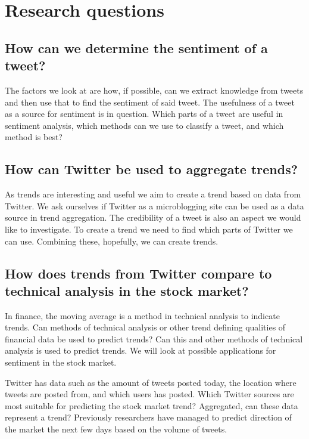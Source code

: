 \section{Research questions}\label{introduction:research_questions}
\subsection{How can we determine the sentiment of a
tweet?}\label{introduction:rq1}

The factors we look at are how, if possible, can we extract knowledge from
tweets and then use that to find the sentiment of said tweet. The usefulness of
a tweet as a source for sentiment is in question. Which parts of a tweet are
useful in sentiment analysis, which methods can we use to classify a tweet, and
which method is best?

\subsection{How can Twitter be used to aggregate trends?}\label{introduction:rq2}
As trends are interesting and useful we aim to create a trend based on data
from Twitter. We ask ourselves if Twitter as a microblogging site can be used as a
data source in trend aggregation. The credibility of a tweet is also an
aspect we would like to investigate. To create a trend we need to find which
parts of Twitter we can use. Combining these, hopefully, we can create trends. 

\subsection{How does trends from Twitter compare to technical analysis in the
stock market?}\label{introduction:rq3}
In finance, the moving average is a method in technical analysis to indicate 
trends. Can methods of technical analysis or other trend defining qualities of
financial data be used to predict trends? Can this and other methods of
technical analysis is used to predict trends.  We will look at possible
applications for sentiment in the stock market.

Twitter has data such as the amount of tweets posted today, the location where
tweets are posted from, and which users has posted. Which Twitter sources are
most suitable for predicting the stock market trend? Aggregated, can these data
represent a trend? Previously researchers have managed to predict
direction of the market the next few days based on the volume of
tweets\cite[]{doukas10:sentiment_and_momentum}.  

